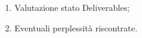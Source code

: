 \begin{enumerate}
    \item Valutazione stato Deliverables;
    \item Eventuali perplessità riscontrate.
\end{enumerate}